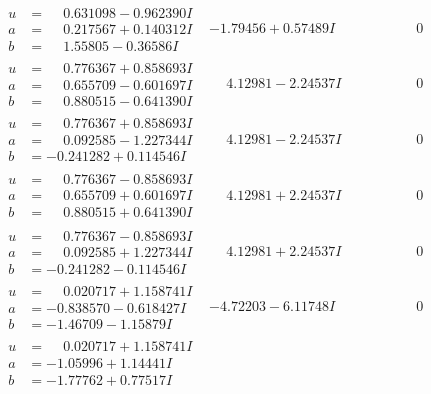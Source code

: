 \documentclass[1p]{elsarticle_modified}
\theoremstyle{definition}
\begin{document}
$$\begin{array}{c|c|c}
\begin{aligned}
u &= \phantom{-}0.631098 - 0.962390 I \\
a &= \phantom{-}0.217567 + 0.140312 I \\
b &= \phantom{-}1.55805 - 0.36586 I\end{aligned}
 & -1.79456 + 0.57489 I & \phantom{-0.000000 } 0 \\ \hline\begin{aligned}
u &= \phantom{-}0.776367 + 0.858693 I \\
a &= \phantom{-}0.655709 - 0.601697 I \\
b &= \phantom{-}0.880515 - 0.641390 I\end{aligned}
 & \phantom{-}4.12981 - 2.24537 I & \phantom{-0.000000 } 0 \\ \hline\begin{aligned}
u &= \phantom{-}0.776367 + 0.858693 I \\
a &= \phantom{-}0.092585 - 1.227344 I \\
b &= -0.241282 + 0.114546 I\end{aligned}
 & \phantom{-}4.12981 - 2.24537 I & \phantom{-0.000000 } 0 \\ \hline\begin{aligned}
u &= \phantom{-}0.776367 - 0.858693 I \\
a &= \phantom{-}0.655709 + 0.601697 I \\
b &= \phantom{-}0.880515 + 0.641390 I\end{aligned}
 & \phantom{-}4.12981 + 2.24537 I & \phantom{-0.000000 } 0 \\ \hline\begin{aligned}
u &= \phantom{-}0.776367 - 0.858693 I \\
a &= \phantom{-}0.092585 + 1.227344 I \\
b &= -0.241282 - 0.114546 I\end{aligned}
 & \phantom{-}4.12981 + 2.24537 I & \phantom{-0.000000 } 0 \\ \hline\begin{aligned}
u &= \phantom{-}0.020717 + 1.158741 I \\
a &= -0.838570 - 0.618427 I \\
b &= -1.46709 - 1.15879 I\end{aligned}
 & -4.72203 - 6.11748 I & \phantom{-0.000000 } 0 \\ \hline\begin{aligned}
u &= \phantom{-}0.020717 + 1.158741 I \\
a &= -1.05996 + 1.14441 I \\
b &= -1.77762 + 0.77517 I\end{aligned}

\end{array}$$
\end{document}
